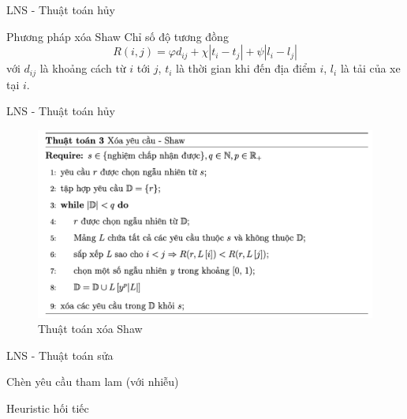 \begin{frame}{LNS - Thuật toán hủy}
  \begin{block}{Phương pháp xóa Shaw}
    Chỉ số độ tương đồng 
    \begin{equation}
      \label{eq:shaw_related}
      R(i,j) = \varphi d_{ij} + \chi |t_{i}-t_{j}| + \psi|l_i - l_j|
    \end{equation}
    với $d_{ij}$ là khoảng cách từ $i$ tới $j$, $t_i$ là thời gian khi đến địa điểm $i$, $l_i$ là tải của xe tại $i$.
  \end{block}
\end{frame}

\begin{frame}{LNS - Thuật toán hủy}
  \begin{figure}[H] %
    \centering %
    \includegraphics[width=1\textwidth]{figures/des_shaw.png} 
    \caption{Thuật toán xóa Shaw} 
    \label{fig:shaw_pseudo}
  \end{figure} 
\end{frame}

\begin{frame}{LNS - Thuật toán sửa}
  \begin{block}{Chèn yêu cầu tham lam (với nhiễu)}
  \end{block}
  \begin{block}{Heuristic hối tiếc}
  \end{block}
\end{frame}

